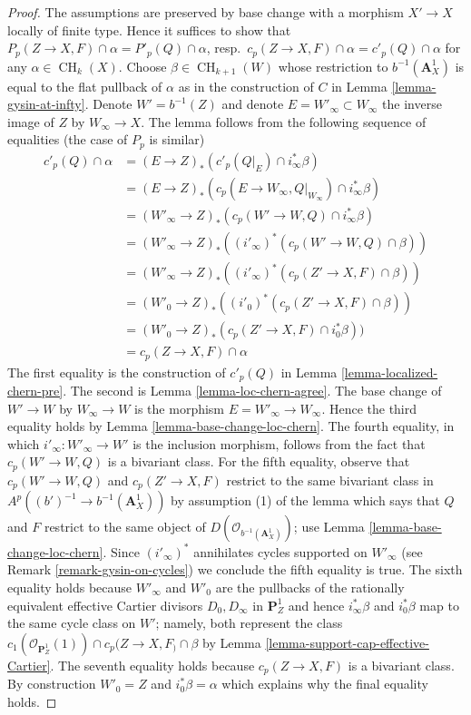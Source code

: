 \documentclass[10pt,a4paper]{amsart}
\theoremstyle{plain}
\theoremstyle{definition}
\theoremstyle{remark}
\numberwithin{equation}{subsection}
\def\CH{\mathop{\mathrm{CH}}\nolimits}
\begin{document}
\begin{proof}
The assumptions are preserved by base change with a morphism
$X' \to X$ locally of finite type. Hence it suffices to show that
$P_p(Z \to X, F) \cap \alpha = P'_p(Q) \cap \alpha$,
resp.\ $c_p(Z \to X, F) \cap \alpha = c'_p(Q) \cap \alpha$
for any $\alpha \in \CH_k(X)$. Choose $\beta \in \CH_{k + 1}(W)$
whose restriction to $b^{-1}(\mathbf{A}^1_X)$ is equal to
the flat pullback of $\alpha$ as in the construction of
$C$ in Lemma \ref{lemma-gysin-at-infty}.
Denote $W' = b^{-1}(Z)$ and denote
$E = W'_\infty \subset W_\infty$ the inverse image of $Z$
by $W_\infty \to X$.
The lemma follows from
the following sequence of equalities (the case of $P_p$ is similar)
\begin{align*}
c'_p(Q) \cap \alpha
& =
(E \to Z)_*(c'_p(Q|_E) \cap i_\infty^*\beta) \\
& =
(E \to Z)_*(c_p(E \to W_\infty, Q|_{W_\infty}) \cap i_\infty^*\beta) \\
& =
(W'_\infty \to Z)_*(c_p(W' \to W, Q) \cap i_\infty^*\beta) \\
& =
(W'_\infty \to Z)_*((i'_\infty)^*(c_p(W' \to W, Q) \cap \beta)) \\
& =
(W'_\infty \to Z)_*((i'_\infty)^*(c_p(Z' \to X, F) \cap \beta)) \\
& =
(W'_0 \to Z)_*((i'_0)^*(c_p(Z' \to X, F) \cap \beta)) \\
& =
(W'_0 \to Z)_*(c_p(Z' \to X, F) \cap i_0^*\beta)) \\
& =
c_p(Z \to X, F) \cap \alpha
\end{align*}
The first equality is the construction of $c'_p(Q)$ in
Lemma \ref{lemma-localized-chern-pre}.
The second is Lemma \ref{lemma-loc-chern-agree}.
The base change of $W' \to W$ by $W_\infty \to W$ is the
morphism $E = W'_\infty \to W_\infty$. Hence the third equality holds
by Lemma \ref{lemma-base-change-loc-chern}. The fourth
equality, in which $i'_\infty : W'_\infty \to W'$ is the
inclusion morphism, follows from the fact that $c_p(W' \to W, Q)$
is a bivariant class. For the fifth equality, observe that
$c_p(W' \to W, Q)$ and $c_p(Z' \to X, F)$
restrict to the same bivariant class in
$A^p((b')^{-1} \to b^{-1}(\mathbf{A}^1_X))$ by
assumption (1) of the lemma which says that $Q$ and $F$ restrict
to the same object of $D(\mathcal{O}_{b^{-1}(\mathbf{A}^1_X)})$;
use Lemma \ref{lemma-base-change-loc-chern}.
Since $(i'_\infty)^*$ annihilates cycles supported on $W'_\infty$
(see Remark \ref{remark-gysin-on-cycles}) we conclude the fifth equality
is true. The sixth equality holds because $W'_\infty$ and $W'_0$
are the pullbacks of the rationally equivalent effective Cartier divisors
$D_0, D_\infty$ in $\mathbf{P}^1_Z$ and hence $i_\infty^*\beta$ and
$i_0^*\beta$ map to the same cycle class on $W'$; namely, both
represent the class
$c_1(\mathcal{O}_{\mathbf{P}^1_Z}(1)) \cap c_p(Z \to X, F_) \cap \beta$ by
Lemma \ref{lemma-support-cap-effective-Cartier}.
The seventh equality holds because $c_p(Z \to X, F)$ is
a bivariant class. By construction $W'_0 = Z$ and $i_0^*\beta = \alpha$
which explains why the final equality holds.
\end{proof}
\end{document}
